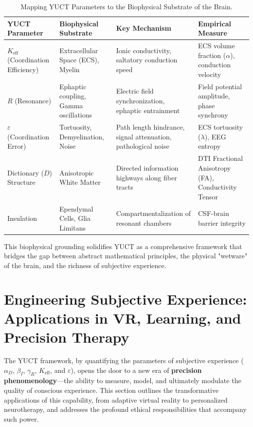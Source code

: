 \documentclass[12pt,a4paper]{article}
\begin{document}
	\begin{table}[H]
		\centering
		\caption{Mapping YUCT Parameters to the Biophysical Substrate of the Brain.}
		\label{tab:biophysical-mapping}
		\small
		\begin{tabular}{p{3cm} p{4cm} p{5cm} p{3cm}}
			\toprule
			\textbf{YUCT Parameter} & \textbf{Biophysical Substrate} & \textbf{Key Mechanism} & \textbf{Empirical Measure} \\
			\midrule
			\(K_{\mathrm{eff}}\) (Coordination Efficiency) & Extracellular Space (ECS), Myelin & Ionic conductivity, saltatory conduction speed & ECS volume fraction (\(\alpha\)), conduction velocity \\
			\(R\) (Resonance) & Ephaptic coupling, Gamma oscillations & Electric field synchronization, ephaptic entrainment & Field potential amplitude, phase synchrony \\
			\(\varepsilon\) (Coordination Error) & Tortuosity, Demyelination, Noise & Path length hindrance, signal attenuation, pathological noise & ECS tortuosity (\(\lambda\)), EEG entropy \\
			Dictionary (\(D\)) Structure & Anisotropic White Matter & Directed information highways along fiber tracts & DTI Fractional Anisotropy (FA), Conductivity Tensor \\
			Insulation & Ependymal Cells, Glia Limitans & Compartmentalization of resonant chambers & CSF-brain barrier integrity \\
			\bottomrule
		\end{tabular}
	\end{table}
	
	This biophysical grounding solidifies YUCT as a comprehensive framework that bridges the gap between abstract mathematical principles, the physical "wetware" of the brain, and the richness of subjective experience.
	
	\section{Engineering Subjective Experience: Applications in VR, Learning, and Precision Therapy}
	
	The YUCT framework, by quantifying the parameters of subjective experience (\(\alpha_D\), \(\beta_I\), \(\gamma_R\), \(K_{\mathrm{eff}}\), and \(\varepsilon\)), opens the door to a new era of \textbf{precision phenomenology}—the ability to measure, model, and ultimately modulate the quality of conscious experience. This section outlines the transformative applications of this capability, from adaptive virtual reality to personalized neurotherapy, and addresses the profound ethical responsibilities that accompany such power.
	
\end{document}
